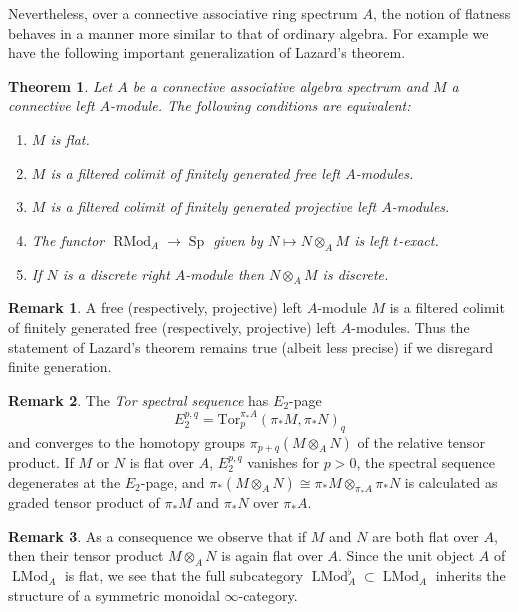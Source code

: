 \documentclass[12pt]{article}
\newtheorem{theorem}{Theorem}[subsection]
\theoremstyle{definition}
\newtheorem{remark}{Remark}[subsection]
\DeclareMathOperator{\LMod}{LMod}
\DeclareMathOperator{\RMod}{RMod}
\DeclareMathOperator{\Sp}{Sp}
\begin{document}
Nevertheless, over a connective associative ring spectrum $A$, the notion of flatness behaves in a manner more similar to that of ordinary algebra. For example we have the following important generalization of Lazard's theorem.

\begin{theorem}{\em \cite[Theorem 7.2.2.15]{HA}}
Let $A$ be a connective associative algebra spectrum and $M$ a connective left $A$-module. The following conditions are equivalent:
\begin{enumerate}
\itemsep.1em
\item[\em{(1)}]
$M$ is flat.
\item[\em{(2)}]
$M$ is a filtered colimit of finitely generated free left $A$-modules.
\item[\em{(3)}]
$M$ is a filtered colimit of finitely generated projective left $A$-modules.
\item[\em{(4)}]
The functor $\RMod_A\to\Sp$ given by $N\mapsto N\otimes_A M$ is left $t$-exact.
\item[\em{(5)}]
If $N$ is a discrete right $A$-module then $N\otimes_A M$ is discrete.
\end{enumerate}
\end{theorem}
\begin{remark}
A free (respectively, projective) left $A$-module $M$ is a filtered colimit of finitely generated free (respectively, projective) left $A$-modules.
Thus the statement of Lazard's theorem remains true (albeit less precise) if we disregard finite generation.
\end{remark}

\begin{remark}
The {\em Tor spectral sequence} has $E_2$-page
\[
E_2^{p,q} =\mathrm{Tor}^{\pi_*A}_p(\pi_* M,\pi_* N)_q
\]
and converges to the homotopy groups $\pi_{p+q}(M\otimes_A N)$ of the relative tensor product.
If $M$ or $N$ is flat over $A$, $E_2^{p,q}$ vanishes for $p>0$, the spectral sequence degenerates at the $E_2$-page, and
$
\pi_*(M\otimes_A N)\cong\pi_* M\otimes_{\pi_* A}\pi_* N
$
is calculated as graded tensor product of $\pi_* M$ and $\pi_* N$ over $\pi_* A$.
\end{remark}
\begin{remark}
As a consequence we observe that if $M$ and $N$ are both flat over $A$, then their tensor product $M\otimes_A N$ is again
flat over $A$. Since the unit object $A$ of $\LMod_A$ is
flat, we see that the full subcategory $\LMod_A^\flat\subset\LMod_A$ inherits the structure
of a symmetric monoidal $\infty$-category.
\end{remark}
\end{document}
